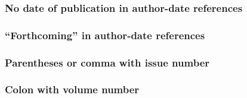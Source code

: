 \documentclass[11pt,letterpaper,oneside]{article}
\begin{document}
\begin{citeref}
\item \parencite{draper1987}
\item \parencite{harrington1987}
\item \parencite{zukowsky1987}
\end{citeref}

\setcounter{subsubsection}{43}
\subsubsection{No date of publication in author-date references}

\begin{citeref}
\item \parencite{nano1750}
\item \parencite{nano}
\end{citeref}

\subsubsection{``Forthcoming'' in author-date references}

\begin{citeref}
\item \parencite{faraday}
\end{citeref}

\setcounter{subsubsection}{46}
\subsubsection{Parentheses or comma with issue number}

\begin{citeref}
\item \parencite{glass2014}
\item \parencite{meyerovitch1959}
\end{citeref}

\subsubsection{Colon with volume number}

\begin{citeref}
\item \parencite{gunderson2015}
\end{citeref}
\end{document}
